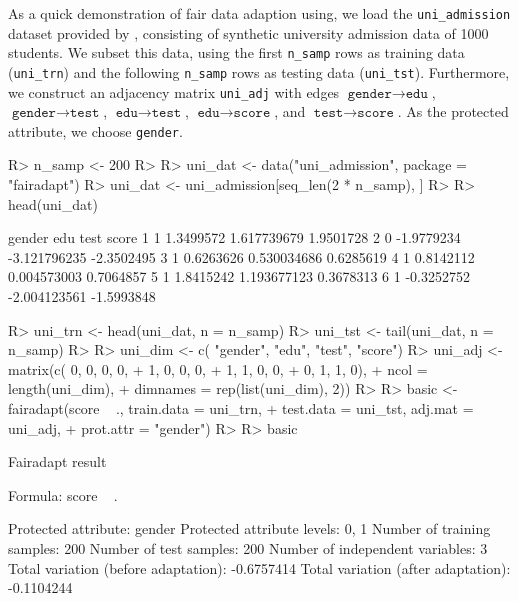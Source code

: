 \documentclass[
  nojss]{jss}
\begin{document}
As a quick demonstration of fair data adaption using, we load the
\texttt{uni\_admission} dataset provided by , consisting
of synthetic university admission data of 1000 students. We subset this
data, using the first \texttt{n\_samp} rows as training data
(\texttt{uni\_trn}) and the following \texttt{n\_samp} rows as testing
data (\texttt{uni\_tst}). Furthermore, we construct an adjacency matrix
\texttt{uni\_adj} with edges \(\texttt{gender} \to \texttt{edu}\),
\(\texttt{gender} \to \texttt{test}\),
\(\texttt{edu} \to \texttt{test}\), \(\texttt{edu} \to \texttt{score}\),
and \(\texttt{test} \to \texttt{score}\). As the protected attribute, we
choose \texttt{gender}.

\begin{CodeChunk}
\begin{CodeInput}
R> n_samp <- 200
R> 
R> uni_dat <- data("uni_admission", package = "fairadapt")
R> uni_dat <- uni_admission[seq_len(2 * n_samp), ]
R> 
R> head(uni_dat)
\end{CodeInput}
\begin{CodeOutput}
  gender        edu         test      score
1      1  1.3499572  1.617739679  1.9501728
2      0 -1.9779234 -3.121796235 -2.3502495
3      1  0.6263626  0.530034686  0.6285619
4      1  0.8142112  0.004573003  0.7064857
5      1  1.8415242  1.193677123  0.3678313
6      1 -0.3252752 -2.004123561 -1.5993848
\end{CodeOutput}
\begin{CodeInput}
R> uni_trn <- head(uni_dat, n = n_samp)
R> uni_tst <- tail(uni_dat, n = n_samp)
R> 
R> uni_dim <- c(       "gender", "edu", "test", "score")
R> uni_adj <- matrix(c(       0,     0,      0,       0,
+                             1,     0,      0,       0,
+                             1,     1,      0,       0,
+                             0,     1,      1,       0),
+                   ncol = length(uni_dim),
+                   dimnames = rep(list(uni_dim), 2))
R> 
R> basic <- fairadapt(score ~ ., train.data = uni_trn,
+                     test.data = uni_tst, adj.mat = uni_adj,
+                     prot.attr = "gender")
R> 
R> basic
\end{CodeInput}
\begin{CodeOutput}
Fairadapt result

Formula:
 score ~ . 

Protected attribute:                  gender 
Protected attribute levels:           0, 1 
Number of training samples:           200 
Number of test samples:               200 
Number of independent variables:      3 
Total variation (before adaptation):  -0.6757414 
Total variation (after adaptation):   -0.1104244 
\end{CodeOutput}
\end{CodeChunk}
\end{document}
